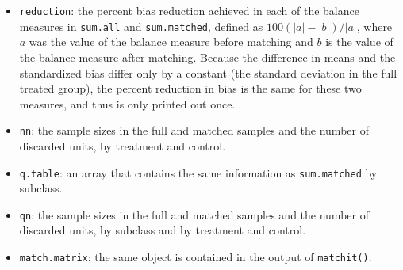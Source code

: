 \begin{itemize}
\item \texttt{reduction}: the percent bias reduction achieved in each
  of the balance measures in \texttt{sum.all} and
  \texttt{sum.matched}, defined as $100(|a|-|b|)/|a|$, where $a$ was
  the value of the balance measure before matching and $b$ is the
  value of the balance measure after matching.  Because the difference
  in means and the standardized bias differ only by a constant (the
  standard deviation in the full treated group), the percent reduction
  in bias is the same for these two measures, and thus is only printed
  out once.
  
\item \texttt{nn}: the sample sizes in the full and matched samples
  and the number of discarded units, by treatment and control.
  
\item \texttt{q.table}: an array that contains the same information
  as \texttt{sum.matched} by subclass.
  
\item \texttt{qn}: the sample sizes in the full and matched
  samples and the number of discarded units, by subclass and by
  treatment and control.
\item \texttt{match.matrix}: the same object is contained in the
  output of {\tt matchit()}.
\end{itemize}

